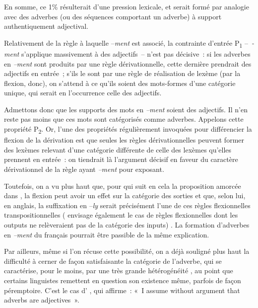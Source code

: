 \documentclass[output=paper]{langsci/langscibook}
\begin{document}
En somme, ce 1\% résulterait d'une pression lexicale, et serait formé par analogie avec des adverbes (ou des séquences comportant un adverbe) à support authentiquement adjectival.

Relativement  de la règle à laquelle --\emph{ment} est associé, la contrainte d'entrée P\textsubscript{1} --~\emph{-ment} s'applique massivement à des adjectifs~-- n'est pas décisive~: si les adverbes en \emph{--ment} sont produits par une règle dérivationnelle, cette dernière prendrait des adjectifs en entrée~; s'ils le sont par une règle de réalisation de lexème (par la flexion, donc), on s'attend à ce qu'ils soient des mots-formes d'une catégorie unique, qui serait en l'occurrence celle des adjectifs.


Admettons donc que les supports des mots en \emph{--ment} soient des adjectifs. Il n'en reste pas moins que ces mots sont catégorisés comme adverbes. Appelons cette propriété P\textsubscript{2}. Or, l'une des propriétés régulièrement invoquées pour différencier la flexion de la dérivation est que seules les règles dérivationnelles peuvent former des lexèmes relevant d'une catégorie différente de celle des lexèmes qu'elles prennent en entrée~: on tiendrait là l'argument décisif en faveur du caractère dérivationnel de la règle ayant \emph{--ment} pour exposant.

Toutefois, on a vu plus haut que, pour %
\citet{Haspelmath1996} %
%
qui suit en cela la proposition amorcée dans %
\citet{Bybee85}%
%
, la flexion peut avoir un effet sur la catégorie des sorties et que, selon lui, en anglais, la suffixation en --\emph{ly} serait précisément l'une de ces règles flexionnelles  transpositionnelles %
(%
\citealt{Scalise1988} %
%
 envisage également le cas de règles flexionnelles  dont les outputs ne relèveraient pas de la catégorie des inputs)%
%
. La formation d'adverbes en \emph{--ment} du français pourrait être passible de la même explication.

Par ailleurs, même si l'on récuse cette possibilité, on a déjà souligné plus haut la difficulté à cerner de façon satisfaisante la catégorie de l'adverbe, qui se caractérise, pour le moins, par une très grande hétérogénéité %
\citep{Ricca15}%
%
, au point que certains linguistes remettent en question son existence même, parfois de façon péremptoire. C'est le cas d'%
\citet[10]{Aronoff94}%
%
, qui affirme~: «~I assume without argument that adverbs are adjectives~».
\end{document}
